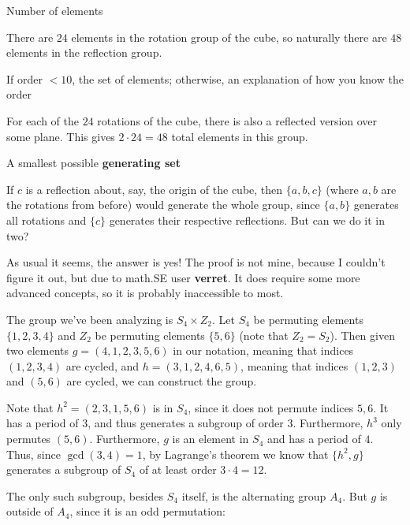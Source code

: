 \documentclass[../gatm_answers.tex]{subfiles}
\begin{document}
\begin{inner_problem}[start=1]
\item Number of elements
\end{inner_problem}

There are $24$ elements in the rotation group of the cube, so naturally there are $48$ elements in the reflection group.

\begin{inner_problem}
\item If order $< 10$, the set of elements; otherwise, an explanation of how you know the order
\end{inner_problem}

For each of the $24$ rotations of the cube, there is also a reflected version over some plane. This gives $2\cdot 24=48$ total elements in this group.

\begin{inner_problem}
\item A smallest possible \textbf{generating set}
\end{inner_problem}

If $c$ is a reflection about, say, the origin of the cube, then $\{a,b,c\}$ (where $a,b$ are the rotations from before) would generate the whole group, since $\{a,b\}$ generates all rotations and $\{c\}$ generates their respective reflections. But can we do it in two?

As usual it seems, the answer is yes! The proof is not mine, because I couldn't figure it out, but due to math.SE user \textbf{verret}. It does require some more advanced concepts, so it is probably inaccessible to most.

The group we've been analyzing is $S_4\times Z_2$. Let $S_4$ be permuting elements $\{1,2,3,4\}$ and $Z_2$ be permuting elements $\{5,6\}$ (note that $Z_2=S_2$). Then given two elements $g=(4,1,2,3,5,6)$ in our notation, meaning that indices $(1,2,3,4)$ are cycled, and $h=(3,1,2,4,6,5)$, meaning that indices $(1,2,3)$ and $(5,6)$ are cycled, we can construct the group.

Note that $h^2=(2,3,1,5,6)$ is in $S_4$, since it does not permute indices $5,6$. It has a period of $3$, and thus generates a subgroup of order $3$. Furthermore, $h^3$ only permutes $(5,6)$. Furthermore, $g$ is an element in $S_4$ and has a period of $4$. Thus, since $\gcd(3,4)=1$, by Lagrange's theorem we know that $\{h^2,g\}$ generates a subgroup of $S_4$ of at least order $3\cdot 4=12$.

The only such subgroup, besides $S_4$ itself, is the alternating group $A_4$. But $g$ is outside of $A_4$, since it is an odd permutation:
\end{document}
